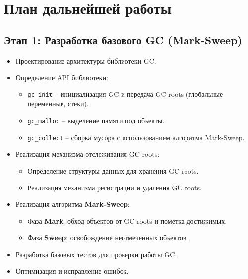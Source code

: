 \section{План дальнейшей работы}

\subsection{Этап 1: Разработка базового GC (Mark-Sweep)}
\begin{itemize}
    \item Проектирование архитектуры библиотеки GC.
    \item Определение API библиотеки:
    \begin{itemize}
        \item \texttt{gc\_init} – инициализация GC и передача GC roots (глобальные переменные, стеки).
        \item \texttt{gc\_malloc} – выделение памяти под объекты.
        \item \texttt{gc\_collect} – сборка мусора с использованием алгоритма Mark-Sweep.
    \end{itemize}
    \item Реализация механизма отслеживания GC roots:
    \begin{itemize}
        \item Определение структуры данных для хранения GC roots.
        \item Реализация механизма регистрации и удаления GC roots.
    \end{itemize}
    \item Реализация алгоритма \textbf{Mark-Sweep}:
    \begin{itemize}
        \item Фаза \textbf{Mark}: обход объектов от GC roots и пометка достижимых.
        \item Фаза \textbf{Sweep}: освобождение неотмеченных объектов.
    \end{itemize}
    \item Разработка базовых тестов для проверки работы GC.
    \item Оптимизация и исправление ошибок.
\end{itemize}


